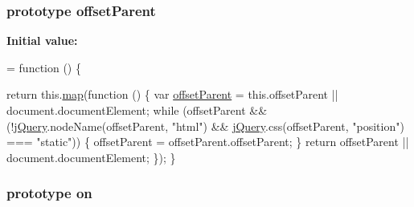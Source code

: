 \subsubsection[{\texorpdfstring{offset\+Parent}{offsetParent}}]{ {\bf prototype} offset\+Parent}\hypertarget{jquery-2_82_81-vsdoc_8js_a2d4c0b0aec0a3b2c4e287976b2587d82}{}\label{jquery-2_82_81-vsdoc_8js_a2d4c0b0aec0a3b2c4e287976b2587d82}
{\bfseries Initial value\+:}
\begin{DoxyCode}
= \textcolor{keyword}{function} () \{
        

        \textcolor{keywordflow}{return} this.\hyperlink{jquery-2_82_81-vsdoc_8js_a20838f8c4bedc779e51bf830f5a4d471}{map}(\textcolor{keyword}{function} () \{
            var \hyperlink{jquery-2_82_81-vsdoc_8js_a2d4c0b0aec0a3b2c4e287976b2587d82}{offsetParent} = this.offsetParent || document.documentElement;
            \textcolor{keywordflow}{while} (offsetParent && (!\hyperlink{jquery-2_82_81-vsdoc_8js_add5237586d970a38a81f990e8eb28c6c}{jQuery}.nodeName(offsetParent, \textcolor{stringliteral}{"html"}) && 
      \hyperlink{jquery-2_82_81-vsdoc_8js_add5237586d970a38a81f990e8eb28c6c}{jQuery}.css(offsetParent, \textcolor{stringliteral}{"position"}) === \textcolor{stringliteral}{"static"})) \{
                offsetParent = offsetParent.offsetParent;
            \}
            \textcolor{keywordflow}{return} offsetParent || document.documentElement;
        \});
    \}
\end{DoxyCode}
\subsubsection[{\texorpdfstring{on}{on}}]{ {\bf prototype} on}\hypertarget{jquery-2_82_81-vsdoc_8js_ae453b412b883f60220d73468ef6c6dbc}{}\label{jquery-2_82_81-vsdoc_8js_ae453b412b883f60220d73468ef6c6dbc}
